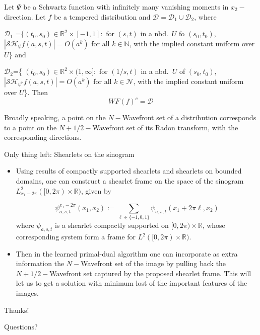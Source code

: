 \begin{frame}

\begin{theorem} 
Let $\Psi$ be a Schwartz function with infinitely many vanishing moments in $x_2-$direction. Let $f$ be a tempered distribution and $\mathcal{D}=\mathcal{D}_1\cup\mathcal{D}_2$, where

 $\mathcal{D}_1$ =\{$(t_0,s_0)\in \mathbb{R}^2\times [-1,1]:$ for $(s,t)$ in a nbd.\ $U$ fo $(s_0,t_0)$, $|\mathcal{SH}_{\psi}f(a,s,t)|=O(a^k)$ for all $k\in\mathbb{N}$, with the implied constant uniform over $U$\} and

$\mathcal{D}_2$=\{ $(t_0,s_0)\in\mathbb{R}^2\times (1,\infty]:$ for $(1/s,t)$ in a nbd.\ $U$ of $(s_0,t_0)$, $|\mathcal{SH}_{\psi ^{\nu}}f(a,s,t)|=O(a^k)$ for all $k\in\mathcal{N}$, with the implied constant uniform over $U$\}. Then
$$
WF(f)^c=\mathcal{D}
$$
\end{theorem}

\pause

\begin{theorem}[O. \"Otkem et al., 2008]
Broadly speaking, a point on the $N-$Wavefront set of a distribution corresponds to a point on the $N+1/2-$Wavefront set of its Radon transform, with the corresponding directions.
\end{theorem}
\end{frame}

\begin{frame}{Only thing left: Shearlets on the sinogram}
\begin{itemize}
\item Using results of compactly supported shearlets and shearlets on bounded domains, one can construct a shearlet frame on the space of the sinogram $L^2_{x_1-2\pi}([0,2\pi)\times \mathbb{R})$, given by

$$
\psi_{a,s,t}^{x_1-2\pi}(x_1,x_2):=\sum_{\ell\in\{-1,0,1\}}\psi_{a,s,t}(x_1+2\pi\ell,x_2)
$$
where $\psi_{a,s,t}$ is a shearlet compactly supported on $[0,2\pi)\times \mathbb{R}$, whose corresponding system form a frame for $L^2([0,2\pi)\times \mathbb{R})$.

\pause

\item Then in the learned primal-dual algorithm one can incorporate as extra information the $N-$Wavefront set of the image by pulling back the $N+1/2-$Wavefront set captured by the proposed shearlet frame. This will let us to get a solution with minimum lost of the important features of the images.
\end{itemize}
\end{frame}

\begin{frame}{Thanks!}
\begin{center}
\Large{Questions?}
\end{center}
\end{frame}

